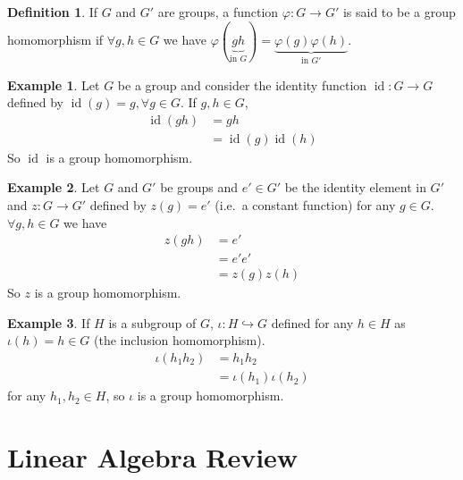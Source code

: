\documentclass[12pt,letterpaper,DIV=11,final]{scrartcl}
\theoremstyle{plain}
\theoremstyle{definition}
\newtheorem{definition}{Definition}[section]
\newtheorem{example}{Example}[section]
\theoremstyle{remark}
\DeclareMathOperator{\id}{id}
\begin{document}
\begin{definition}\label{def:grouphomomorphism}
  If $G$ and $G'$ are groups, a function $\varphi: G \to G'$ is said to be a group homomorphism if $\forall g, h \in G$ we have $\varphi(\underbrace{gh}_\text{in $G$}) = \underbrace{\varphi(g) \varphi(h)}_\text{in $G'$}$.
\end{definition}

\begin{example}
  Let $G$ be a group and consider the identity function $\id : G \to G$ defined by $\id(g) = g, \forall g \in G$.
  If $g, h \in G$,
  \begin{align*}
    \id(gh) &= gh \\
            &= \id(g) \id(h)
  \end{align*}
  So $\id$ is a group homomorphism.
\end{example}

\begin{example}
  Let $G$ and $G'$ be groups and $e' \in G'$ be the identity element in $G'$ and
  $z : G \to G'$ defined by $z(g) = e'$ (i.e.\ a constant function) for any $g \in G$.
  $\forall g, h \in G$ we have
  \begin{align*}
    z(gh) &= e' \\
          &= e' e' \\
          &= z(g) z(h)
  \end{align*}
  So $z$ is a group homomorphism.
\end{example}

\begin{example}\label{ex:inclusionhomomorphism}
  If $H$ is a subgroup of $G$, $\iota : H \hookrightarrow G$ defined for any $h \in H$ as $\iota(h) = h \in G$ (the inclusion homomorphism).
  \begin{align*}
    \iota(h_1 h_2) &= h_1 h_2 \\
                   &= \iota(h_1) \iota(h_2)
  \end{align*} for any $h_1, h_2 \in H$, so $\iota$ is a group homomorphism.
\end{example}

\section{Linear Algebra Review}
\end{document}
